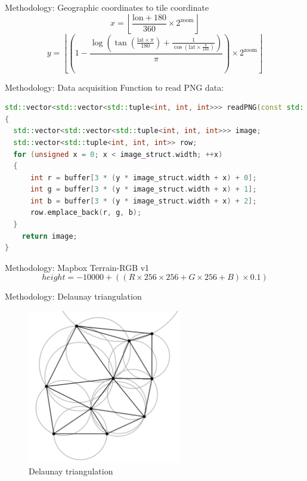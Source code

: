 \documentclass[10pt]{beamer}
\begin{document}
\begin{frame}{Methodology: Geographic coordinates to tile coordinate}
  \Large
  \[
  x = \left\lfloor
    \frac{\text{lon} + 180}{360} \times 2^{\text{zoom}}
  \right\rfloor
  \]
  \vspace{1em}
  \[
  y = \left\lfloor
    \left(1 -
        \frac{
            \log\left(
                \tan\left(\frac{\text{lat} \times \pi}{180}\right) + 
                \frac{1}{\cos\left(\text{lat} \times \frac{\pi}{180}\right)}
            \right)
        }{\pi}
    \right) \times 2^{\text{zoom}}
  \right\rfloor
  \]
\end{frame}

\begin{frame}[fragile]{Methodology: Data acquisition}
  \Large
  Function to read PNG data:
  \vspace{1em}
  \begin{lstlisting}[language=C++]
std::vector<std::vector<std::tuple<int, int, int>>> readPNG(const std::vector<char> &data)
{
  std::vector<std::vector<std::tuple<int, int, int>>> image;
  std::vector<std::tuple<int, int, int>> row;
  for (unsigned x = 0; x < image_struct.width; ++x)
  {
      int r = buffer[3 * (y * image_struct.width + x) + 0];
      int g = buffer[3 * (y * image_struct.width + x) + 1];
      int b = buffer[3 * (y * image_struct.width + x) + 2];
      row.emplace_back(r, g, b);
  }
    return image;
}
  \end{lstlisting}
\end{frame}

\begin{frame}{Methodology: Mapbox Terrain-RGB v1}
  \Large
  \[
  height = -10000 + ((R \times 256 \times 256 + G \times 256 + B) \times 0.1)
  \]
\end{frame}

\begin{frame}{Methodology: Delaunay triangulation}
  \Large
  \begin{figure}[H]
    \centering
    \includegraphics[width=0.6\textwidth]{images/delaunay-triangulation.png}
    \caption{Delaunay triangulation \cite{img:dt}}
\end{figure}
\end{frame}
\end{document}
